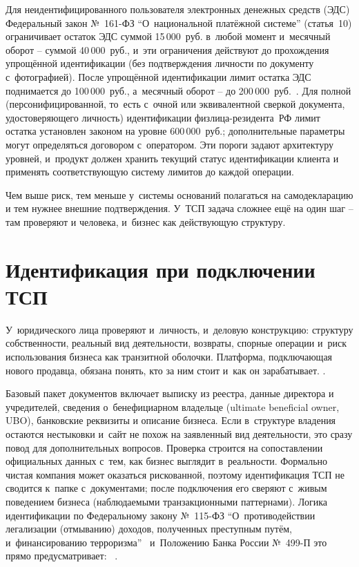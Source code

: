 Для неидентифицированного пользователя электронных денежных
средств (ЭДС) Федеральный закон №~161-ФЗ \enquote{О~национальной
платёжной системе} (статья~10) ограничивает остаток ЭДС суммой
15\,000~руб. в~любой момент и~месячный оборот -- суммой
40\,000~руб., и~эти ограничения действуют до прохождения
упрощённой идентификации (без подтверждения личности по документу
с~фотографией). После упрощённой идентификации
лимит остатка ЭДС поднимается до 100\,000~руб., а~месячный
оборот -- до 200\,000~руб.~\cite{fz-161}. Для полной
(персонифицированной, то~есть с~очной или эквивалентной сверкой
документа, удостоверяющего личность) идентификации физлица-резидента~РФ
лимит остатка установлен законом на уровне 600\,000~руб.;
дополнительные параметры могут определяться договором
с~оператором. Эти пороги задают архитектуру уровней, и~продукт
должен хранить текущий статус идентификации клиента и применять
соответствующую систему лимитов до каждой операции.

Чем выше риск,
тем меньше у~системы оснований полагаться на самодекларацию и тем
нужнее внешние подтверждения. У~ТСП задача сложнее ещё на один
шаг -- там проверяют и человека, и~бизнес как действующую структуру.

\section{Идентификация при подключении ТСП}\label{sec:kyb-merchants}

У~юридического лица проверяют и~личность, и~деловую
конструкцию: структуру собственности, реальный вид деятельности,
возвраты, спорные операции и~риск использования бизнеса как
транзитной оболочки. Платформа, подключающая нового продавца,
обязана понять, кто за ним стоит и~как он зарабатывает.
.

Базовый пакет документов включает выписку из реестра, данные
директора и учредителей, сведения о~бенефициарном владельце
(ultimate beneficial owner, UBO), банковские реквизиты и описание
бизнеса. Если в~структуре владения остаются нестыковки и~сайт не похож на
заявленный вид деятельности, это сразу повод для дополнительных вопросов. Проверка
строится на сопоставлении официальных данных с~тем, как бизнес
выглядит в~реальности. Формально чистая компания может
оказаться рискованной, поэтому идентификация ТСП не сводится к~папке
с~документами; после подключения его сверяют с~живым поведением
бизнеса (наблюдаемыми транзакционными паттернами). Логика
идентификации по Федеральному закону №~115-ФЗ \enquote{О~противодействии
легализации (отмыванию) доходов, полученных преступным путём,
и~финансированию терроризма}~\cite{fz-115} и~Положению Банка России
№~499-П это прямо предусматривает: ~\cite{cbr-499p}.

